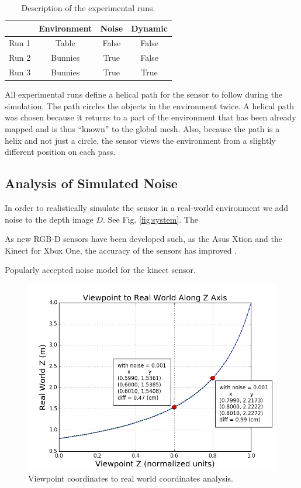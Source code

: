\begin{table}[h]
  \caption{Description of the experimental runs.}
  \label{tab:run}
  \begin{footnotesize}
  \begin{center}
    \begin{tabular}{|l|c|c|c|}
    \hline
           & Environment & Noise   & Dynamic \\\hline
    Run 1	 & Table       & False   & False       \\
    Run 2  & Bunnies     & True    & False       \\
    Run 3  & Bunnies     & True    & True       \\
    \hline
    \end{tabular}
  \end{center}
  \end{footnotesize}
\end{table}

All experimental runs define a helical path for the sensor to follow during the
simulation. The path circles the objects in the environment twice. A helical
path was chosen because it returns to a part of the environment that has been
already mapped and is thus ``known'' to the global mesh. Also, because the path
is a helix and not just a circle, the sensor views the environment from a
slightly different position on each pass.

\subsection{Analysis of Simulated Noise}

In order to realistically simulate the sensor in a real-world environment we add noise to the depth image $D$. See Fig. \ref{fig:system}. The 

As new RGB-D sensors have been developed such, as the Asus Xtion and the Kinect for Xbox One, the accuracy of the sensors has improved \cite{lachat2015first}.

Popularly accepted noise model for the kinect sensor. \cite{Khoshelham2012}



\begin{figure}[h]%
\centering
\includegraphics[width=.5\textwidth]{figures/plot_depth.png}
\caption{Viewpoint coordinates to real world coordinates analysis.}
\label{fig:depth}
\end{figure}
